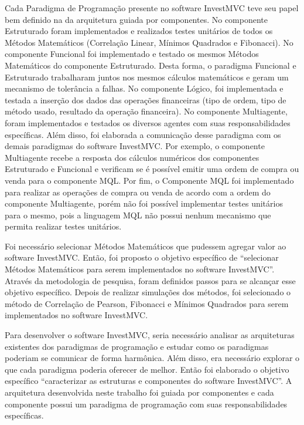 Cada Paradigma de Programação presente no software InvestMVC teve seu papel bem definido na da arquitetura guiada por componentes. No componente Estruturado foram implementados e realizados testes unitários de todos os Métodos Matemáticos (Correlação Linear, Mínimos Quadrados e Fibonacci). No componente Funcional foi implementado e testado os mesmos Métodos Matemáticos do componente Estruturado. Desta forma, o paradigma Funcional e Estruturado trabalharam juntos nos mesmos cálculos matemáticos e geram um mecanismo de tolerância a falhas. No componente Lógico, foi implementada e testada a inserção dos dados das operações financeiras (tipo de ordem, tipo de método usado, resultado da operação financeira). No componente Multiagente, foram implementados e testados os diversos agentes com suas responsabilidades específicas. Além disso, foi elaborada a comunicação desse paradigma com os demais paradigmas do software InvestMVC. Por exemplo, o componente Multiagente recebe a resposta dos cálculos numéricos dos componentes Estruturado e Funcional e verificam se é possível emitir uma ordem de compra ou venda para o componente MQL. Por fim, o Componente MQL foi implementado para realizar as operações de compra ou venda de acordo com a ordem do componente Multiagente, porém não foi possível implementar testes unitários para o mesmo, pois a linguagem MQL não possui nenhum mecanismo que permita realizar testes unitários.

Foi necessário selecionar Métodos Matemáticos que pudessem agregar valor ao software InvestMVC. Então, foi proposto o objetivo específico de “selecionar Métodos Matemáticos para serem implementados no software InvestMVC”. Através da metodologia de pesquisa, foram definidos passos para se alcançar esse objetivo específico. Depois de realizar simulações dos métodos, foi selecionado o método de Correlação de Pearson, Fibonacci e Mínimos Quadrados para serem implementados no software InvestMVC.

Para desenvolver o software InvestMVC, seria necessário analisar as arquiteturas existentes dos paradigmas de programação e estudar como os paradigmas poderiam se comunicar de forma harmônica. Além disso, era necessário explorar o que cada paradigma poderia oferecer de melhor. Então foi elaborado o objetivo específico “caracterizar as estruturas e componentes do software InvestMVC”. A arquitetura desenvolvida neste trabalho foi guiada por componentes e cada componente possui um paradigma de programação com suas responsabilidades específicas.

